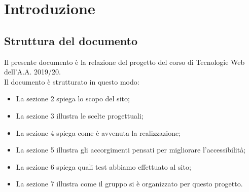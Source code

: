 \documentclass[1_relazione.tex]{subfiles}
\begin{document}
\section{Introduzione}

\subsection{Struttura del documento}
Il presente documento \`{e} la relazione del progetto del corso di Tecnologie Web dell'A.A. 2019/20. \\Il documento \`{e} strutturato in questo modo:
\begin{itemize}
	\item La sezione 2 spiega lo scopo del sito;
	\item La sezione 3 illustra le scelte progettuali;
	\item La sezione 4 spiega come \`{e} avvenuta la realizzazione;
	\item La sezione 5 illustra gli accorgimenti pensati per migliorare l'accessibilit\`{a};
	\item La sezione 6 spiega quali test abbiamo effettuato al sito;
	\item La sezione 7 illustra come il gruppo si \`{e} organizzato per questo progetto.
\end{itemize}
\end{document}
